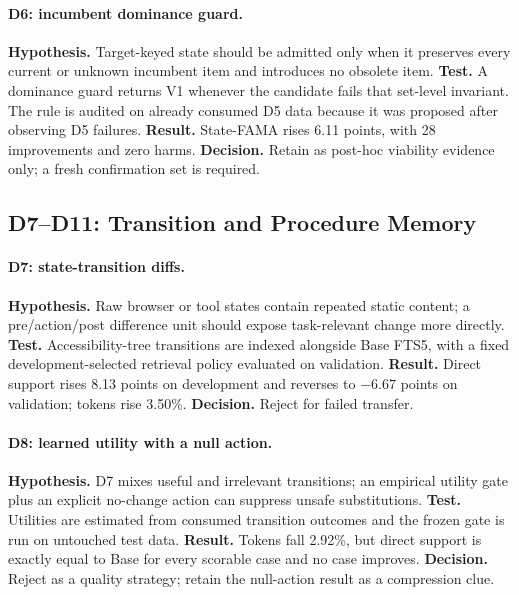 \documentclass[10pt]{article}
\begin{document}
\paragraph{D6: incumbent dominance guard.}
\textbf{Hypothesis.} Target-keyed state should be admitted only when it preserves every current or unknown incumbent item and introduces no obsolete item. \textbf{Test.} A dominance guard returns V1 whenever the candidate fails that set-level invariant. The rule is audited on already consumed D5 data because it was proposed after observing D5 failures. \textbf{Result.} State-FAMA rises 6.11 points, with 28 improvements and zero harms. \textbf{Decision.} Retain as post-hoc viability evidence only; a fresh confirmation set is required.

\subsection{D7--D11: Transition and Procedure Memory}

\paragraph{D7: state-transition diffs.}
\textbf{Hypothesis.} Raw browser or tool states contain repeated static content; a pre/action/post difference unit should expose task-relevant change more directly. \textbf{Test.} Accessibility-tree transitions are indexed alongside Base FTS5, with a fixed development-selected retrieval policy evaluated on validation. \textbf{Result.} Direct support rises 8.13 points on development and reverses to $-6.67$ points on validation; tokens rise 3.50\%. \textbf{Decision.} Reject for failed transfer.

\paragraph{D8: learned utility with a null action.}
\textbf{Hypothesis.} D7 mixes useful and irrelevant transitions; an empirical utility gate plus an explicit no-change action can suppress unsafe substitutions. \textbf{Test.} Utilities are estimated from consumed transition outcomes and the frozen gate is run on untouched test data. \textbf{Result.} Tokens fall 2.92\%, but direct support is exactly equal to Base for every scorable case and no case improves. \textbf{Decision.} Reject as a quality strategy; retain the null-action result as a compression clue.
\end{document}
